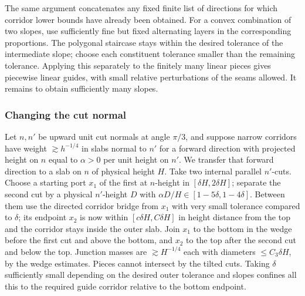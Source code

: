 The same argument concatenates any fixed finite list of directions for
which corridor lower bounds have already been obtained. For a convex
combination of two slopes, use sufficiently fine but fixed alternating
layers in the corresponding proportions. The polygonal staircase stays
within the desired tolerance of the intermediate slope; choose each
constituent tolerance smaller than the remaining tolerance. Applying
this separately to the finitely many linear pieces gives piecewise
linear guides, with small relative perturbations of the seams allowed.
It remains to obtain sufficiently many slopes.

\subsubsection{Changing the cut normal}
Let \(n,n'\) be upward unit cut normals at angle \(\pi/3\), and suppose narrow corridors have weight \(\gtrsim h^{-1/4}\) in slabs normal to \(n'\) for a forward direction with projected height on \(n\) equal to \(\alpha>0\) per unit height on \(n'\). We transfer that forward direction to a slab on \(n\) of physical height \(H\). Take two internal parallel \(n'\)-cuts. Choose a starting port \(x_1\) of the first at \(n\)-height in \([\delta H,2\delta H]\); separate the second cut by a physical \(n'\)-height \(D\) with \(\alpha D/H\in[1-5\delta,1-4\delta]\). Between them use the directed corridor bridge from \(x_1\) with very small tolerance compared to \(\delta\); its endpoint \(x_2\) is now within \([c\delta H,C\delta H]\) in height distance from the top and the corridor stays inside the outer slab. Join \(x_1\) to the bottom in the wedge before the first cut and above the bottom, and \(x_2\) to the top after the second cut and below the top. Junction masses are \(\gtrsim H^{-1/4}\) each with diameters \(\le C_3\delta H\), by the wedge estimates. Pieces cannot intersect by the tilted cuts. Taking \(\delta\) sufficiently small depending on the desired outer tolerance and slopes confines all this to the required guide corridor relative to the bottom endpoint.

